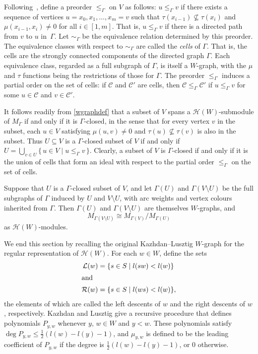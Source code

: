 \documentclass[ALCO,ThmDefs,Unicode,epreuves]{cedram}
\begin{document}
Following~\cite{kazlus:coxhecke}, define a preorder
$\leqslant_{\Gamma}$ on $V$ as follows: $u \leqslant_{\Gamma} v$
if there exists a sequence of vertices $u = x_{0},x_{1},
\ldots, x_{m} = v$ such that $\tau(x_{i-1}) \nsubseteq
\tau(x_{i})$ and $\mu(x_{i-1},x_{i}) \neq 0$ for all $i \in
[1,m]$. That is, $u \leqslant_{\Gamma} v$ if there is a directed path
from $v$ to $u$ in~$\Gamma$. Let $\sim_{\Gamma}$ be
the equivalence relation determined by this preorder.
The equivalence classes with respect to $\sim_{\Gamma}$
are called the \emph{cells} of $\Gamma$. That is, the cells are
the strongly connected components of the directed graph $\Gamma$.
Each equivalence class,
regarded as a full subgraph of $\Gamma$, is itself a $W\!$-graph,
with the $\mu$ and $\tau$ functions being the restrictions
of those for $\Gamma$. The preorder $\leqslant_{\Gamma}$ induces a partial
order on the set of cells: if $\mathcal{C}$ and $\mathcal{C}'$ are
cells, then $\mathcal{C} \leqslant_{\Gamma} \mathcal{C}'$ if $u \leqslant_{\Gamma} v$
for some $u \in \mathcal{C}$ and $v \in \mathcal{C}'$.

It follows readily from \eqref{wgraphdef} that a subset of
$V$ spans a $\mathcal{H}(W)$-submodule of $M_{\Gamma}$ if
and only if it is $\Gamma$-closed, in the sense that for every vertex
$v$ in the subset, each $u\in V$ satisfying $\mu(u,v)\ne 0$ and
$\tau(u)\nsubseteq\tau(v)$ is also in the subset.
Thus $U\subseteq V$ is a $\Gamma$-closed subset of $V$ if and
only if $U=\bigcup_{v\in U}\{\,u\in V\mid u\leqslant_{\Gamma}v\,\}$.
Clearly, a subset of $V$ is $\Gamma$-closed if and only if it is the
union of cells that form an ideal with respect to the partial order
$\leqslant_\Gamma$ on the set of cells.

Suppose that $U$ is a $\Gamma$-closed subset of $V$, and let
$\Gamma(U)$ and $\Gamma(V \setminus U)$ be the full subgraphs of
$\Gamma$ induced by $U$ and $V \setminus U$, with arc weights
and vertex colours inherited from $\Gamma$. Then $\Gamma(U)$ and
$\Gamma(V \setminus U)$ are themselves $W\!$-graphs, and
\[
M_{\Gamma(V \setminus U)} \cong M_{\Gamma(V)}/M_{\Gamma(U)}
\]
as $\mathcal{H}(W)$-modules.

We end this section by recalling the original Kazhdan--Lusztig $W\!$-graph
for the regular representation of $\mathcal{H}(W)$.
For each $w \in W$, define the sets
\begin{align*}
\mathcal{L}(w) &= \{s \in S \mid l(sw) < l(w)\}\\
\intertext{and}
\mathcal{R}(w) & = \{s \in S \mid l(ws) < l(w)\},
\end{align*}
the elements of which are called the left descents of $w$ and the right descents
of $w$, respectively. Kazhdan and Lusztig give a recursive procedure that defines
polynomials $P_{y,w}$ whenever $y,\,w \in W$ and $y < w$. These polynomials satisfy
$\deg P_{y,w}\leqslant\frac12(l(w)-l(y)-1)$, and $\mu_{y,w}$ is defined to be
the leading coefficient of $P_{y,w}$ if the degree is $\frac12(l(w)-l(y)-1)$,
or 0 otherwise.
\end{document}
